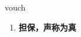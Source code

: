 
\begin{frame}
{\huge vouch}
\begin{center}
\begin{enumerate}\Large
  \item \textbf{担保，声称为真}
\end{enumerate}
\end{center}
\end{frame}

